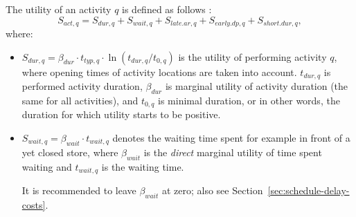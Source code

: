 The utility of an activity $q$ is defined as follows \citep[see also][p.377ff]{CharyparNagel2005ga4acts}:
\begin{equation}
S_{act,q} = S_{dur,q} + S_{wait,q} + S_{late.ar,q} + S_{early.dp, q} + S_{short.dur, q},
\label{eq:matsimUTFact}
\end{equation}
where:
\begin{itemize}
\item $S_{dur,q}= \beta_{dur} \cdot t_{typ,q} \cdot \ln(t_{dur,q}/t_{0,q})$ 
%
is the utility of performing activity $q$, where opening times of activity locations are taken into account. $t_{dur,q}$ is performed activity duration, $\beta_{dur}$ is marginal utility of activity duration (the same for all activities),
and $t_{0,q}$ is minimal duration, or in other words, the duration for which utility starts to be positive. 
%
%
\item $ S_{wait,q} = \beta_{wait} \cdot t_{wait,q}$ 
%
denotes the waiting time spent for example in front of a yet closed store, where $\beta_{wait}$ is the \emph{direct} marginal utility of time spent waiting and $t_{wait,q}$ is the waiting time.

It is recommended to leave $\beta_{wait}$ at zero; also see Section~\ref{sec:schedule-delay-costs}.


\end{itemize}
